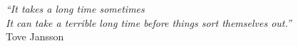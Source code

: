 \cleardoublepage
\thispagestyle{plain}

\vspace*{8cm}

\begin{flushright}
   \textsl{``It takes a long time sometimes\\
   It can take a terrible long time before things sort themselves out.''} \\
\vspace*{1.5cm}
           Tove Jansson
\end{flushright}
